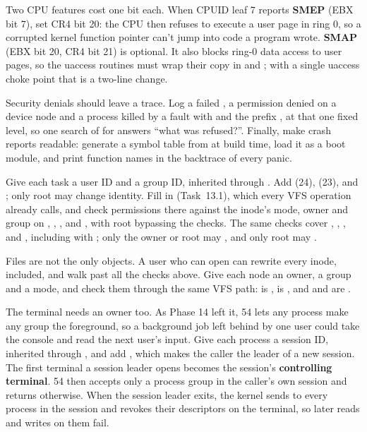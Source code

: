 \documentclass[11pt,a4paper]{article}
\begin{document}
Two CPU features cost one bit each. When CPUID leaf 7 reports \textbf{SMEP} (EBX bit 7), set CR4 bit 20: the CPU then
refuses to execute a user page in ring 0, so a corrupted kernel function pointer can't jump into code a program wrote.
\textbf{SMAP} (EBX bit 20, CR4 bit 21) is optional. It also blocks ring-0 data access to user pages, so the uaccess
routines must wrap their copy in  and ; with a single uaccess choke point that is a two-line
change.

Security denials should leave a trace. Log a failed , a permission denied on a device node and a process
killed by a fault with  and the prefix , at that one fixed level, so
one search of  for  answers ``what was refused?''. Finally, make crash reports readable: generate a symbol
table from  at build time, load it as a boot module, and print function names in the backtrace of
every panic.

Give each task a user ID and a group ID, inherited through . Add  (24),  (23),
 and ; only root may change identity. Fill in  (Task~13.1), which every VFS operation already calls,
and check permissions there against the inode's mode,
owner and group on , , ,  and , with root bypassing the
checks. The same checks cover , , ,  and , including
 with ; only the owner or root may , and only root may .

Files are not the only objects. A user who can open  can rewrite every inode, 
included, and walk past all the checks above. Give each  node an owner, a group and a mode, and check them
through the same VFS path:  is ,  is , and
 and  are .

The terminal needs an owner too. As Phase 14 left it,  54 lets any process make any group the foreground,
so a background job left behind by one user could take the console and read the next user's  input. Give
each process a session ID, inherited through , and add , which makes the caller the leader of
a new session. The first terminal a session leader opens becomes the session's \textbf{controlling terminal}.
 54 then accepts only a process group in the caller's own session and returns  otherwise.
When the session leader exits, the kernel sends  to every process in the session and revokes their
descriptors on the terminal, so later reads and writes on them fail.
\end{document}

